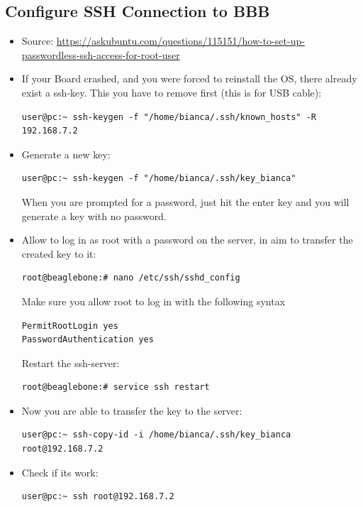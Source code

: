 \documentclass[
	fontsize=10pt
	paper=a4
]{scrartcl}
\begin{document}
\subsection{Configure SSH Connection to BBB}
\begin{itemize}
\item Source: \url{https://askubuntu.com/questions/115151/how-to-set-up-passwordless-ssh-access-for-root-user}

\item If your Board crashed, and you were forced to reinstall the OS, there already exist a ssh-key.
This you have to remove first (this is for USB cable):
\begin{lstlisting}
user@pc:~ ssh-keygen -f "/home/bianca/.ssh/known_hosts" -R 192.168.7.2
\end{lstlisting}

\item Generate a new key:
\begin{lstlisting}
user@pc:~ ssh-keygen -f "/home/bianca/.ssh/key_bianca"
\end{lstlisting}
When you are prompted for a password, just hit the enter key and you will generate a key with no password.

\item Allow to log in as root with a password on the server, in aim to transfer the created key to it:
\begin{lstlisting}
root@beaglebone:# nano /etc/ssh/sshd_config
\end{lstlisting}
Make sure you allow root to log in with the following syntax
\begin{lstlisting}
PermitRootLogin yes
PasswordAuthentication yes
\end{lstlisting}
Restart the ssh-server: 
\begin{lstlisting}
root@beaglebone:# service ssh restart
\end{lstlisting}

\item Now you are able to transfer the key to the server:
\begin{lstlisting}
user@pc:~ ssh-copy-id -i /home/bianca/.ssh/key_bianca root@192.168.7.2
\end{lstlisting}

\item Check if its work:
\begin{lstlisting}
user@pc:~ ssh root@192.168.7.2
\end{lstlisting}


\end{itemize}
\end{document}
